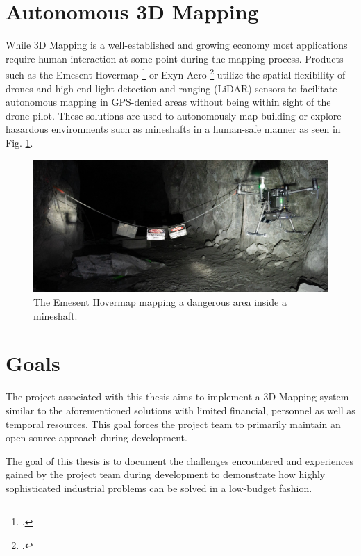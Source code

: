 \section{Autonomous 3D Mapping}
While 3D Mapping is a well-established and growing economy most applications require human interaction at some point during the mapping process. Products such as the Emesent Hovermap \footcite{hovermap2021} or Exyn Aero \footcite{exynAero2021} utilize the spatial flexibility of drones and high-end light detection and ranging (LiDAR) sensors to facilitate autonomous mapping in GPS-denied areas without being within sight of the drone pilot. These solutions are used to autonomously map building or explore hazardous environments such as mineshafts in a human-safe manner as seen in Fig. \ref{fig:hovermap}.

\begin{figure}
	\centering
	\includegraphics[width=0.9\linewidth]{img/hovermap}
	\caption{
		The Emesent Hovermap mapping a dangerous area inside a mineshaft.\protect\footnotemark
	}
	\label{fig:hovermap}
\end{figure}

\section{Goals}
The project associated with this thesis aims to implement a 3D Mapping system similar to the aforementioned solutions with limited financial, personnel as well as temporal resources. This goal forces the project team to primarily maintain an open-source approach during development.

The goal of this thesis is to document the challenges encountered and experiences gained by the project team during development to demonstrate how highly sophisticated industrial problems can be solved in a low-budget fashion. 


